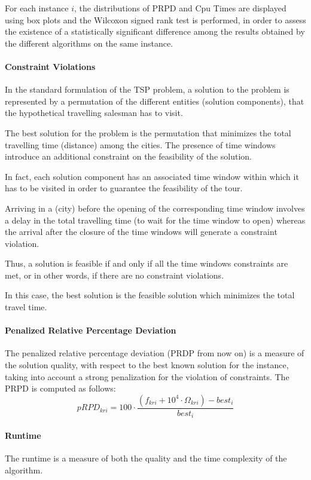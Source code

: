 \begin{homeworkProblem}
For each instance $i$, the distributions of PRPD and Cpu Times are displayed using box plots and the Wilcoxon signed rank test is performed, in order to assess the existence of a statistically significant difference among the results obtained by the different algorithms on the same instance. 

\paragraph{Constraint Violations}
In the standard formulation of the TSP problem, a solution to the problem is represented by a permutation of the different
entities (solution components), that the hypothetical travelling salesman has to visit.

The best solution for the problem is the permutation that minimizes the total travelling time (distance) among the cities.
The presence of time windows introduce an additional constraint on the feasibility of the solution.

In fact, each solution component has an associated time window within which it has to be visited in order to guarantee the feasibility of the tour.

Arriving in a (city) before the opening of the corresponding time window involves a delay in the total travelling time (to wait for the time window to open) whereas the arrival after the closure of the time windows will generate a constraint violation.

Thus, a solution is feasible if and only if all the time windows constraints are met, or in other words, if there are no constraint violations.

In this case, the best solution is the feasible solution which minimizes the total travel time.

\paragraph{Penalized Relative Percentage Deviation}
The penalized relative percentage deviation (PRDP from now on) is a measure of the solution quality, with respect to the best known
solution for the instance, taking into account a strong penalization for the violation of constraints.
The PRPD is computed as follows:
\begin{equation}
pRPD_{kri} = 100 \cdot \frac{(f_{kri} + 10^4\cdot\Omega_{kri})-best_i}{best_i}
\end{equation}

\paragraph{Runtime}
The runtime is a measure of both the quality and the time complexity of the algorithm.


\end{homeworkProblem}
